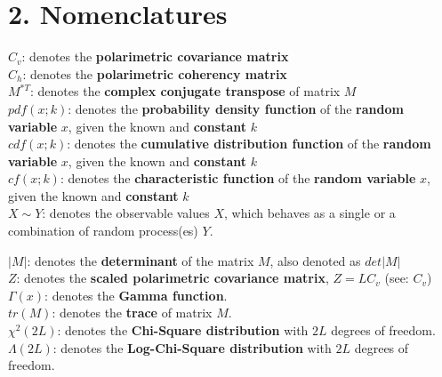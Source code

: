 \documentclass[a4paper, oneside, 11pt]{Latex/Classes/PhDthesisPSnPDF}
\begin{document}
\newpage

\section*{2. Nomenclatures}

\begin{multicols}{2} %

$C_v$: denotes the {\bf polarimetric covariance matrix}\\

$C_h$: denotes the {\bf polarimetric coherency matrix}\\

$M^{*T}$: denotes the {\bf complex conjugate transpose} of matrix $M$ \\

$pdf(x;k)$: denotes the {\bf probability density function} of the {\bf random variable} $x$,
  given the known and {\bf constant} $k$\\

$cdf(x;k)$: denotes the {\bf cumulative distribution function} of the {\bf random variable} $x$,
  given the known and {\bf constant} $k$\\  

$cf(x;k)$: denotes the {\bf characteristic function} of the {\bf random variable} $x$,
  given the known and {\bf constant} $k$\\  

$X \sim Y$: denotes the observable values $X$,
  which behaves as a single or a combination of random process(es) $Y$. 
  
$|M|$: denotes the {\bf determinant} of the matrix $M$, also denoted as $det|M|$\\

$Z$: denotes the {\bf scaled polarimetric covariance matrix}, $Z=LC_v$ (see: $C_v$)\\

$\Gamma(x)$: denotes the {\bf Gamma function}.\\

$tr(M)$: denotes the {\bf trace} of matrix $M$.\\

$\chi^2(2L)$: denotes the {\bf Chi-Square distribution} with $2L$ degrees of freedom.\\

$\Lambda(2L)$: denotes the {\bf Log-Chi-Square distribution} with $2L$ degrees of freedom.\\
  
  
\end{multicols}
\end{document}
